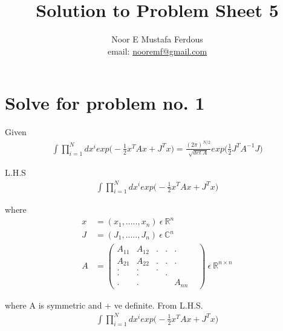 \documentclass[12pt, letterpaper]{article}
\title{Solution to Problem Sheet 5}
\author{Noor E Mustafa Ferdous\\ email: \href{mailto:nooremf@gmail.com}{nooremf@gmail.com} }
\date{}
\newcommand*{\1}{\hspace{1pt}}
\begin{document}
\maketitle

\section*{Solve for problem no. 1}

Given
\begin{align*}
    \int \prod ^{N} _{i=1} dx^{i} exp\bigg(-\frac{1}{2}x^{T}Ax + J^{T}x\bigg) = \frac{(2\pi)^{N/2}}{\sqrt{det \ A}}exp\bigg(\frac{1}{2}J^{T}A^{-1}J\bigg)
\end{align*}

L.H.S 
\begin{align*}
    \int \prod ^{N} _{i=1} dx^{i} exp\bigg(-\frac{1}{2}x^{T}Ax + J^{T}x\bigg)
\end{align*}

where
\begin{align*}
    x &= (x_{1}, .....  , x_{n}) \  \epsilon \ \mathbb{R} ^{n} \\
    J &= (J_{1}, .....  , J_{n}) \  \epsilon \ \mathbb{C} ^{n} \\
    A &= 
    \begin{pmatrix}
        A_{11} & A_{12} &. &. & .\\
        A_{21} & A_{22} & .& .& .\\
        .& .& .& & &\\
        .& .& & .& &\\
        .& .& & & A_{nn}
        \end{pmatrix}
         \ \epsilon  \ \mathbb{R}^{n \times n}
\end{align*}

where A is symmetric and + ve definite.
From L.H.S.
\begin{align*}
    \int \prod ^{N} _{i=1} dx^{i} exp\bigg(-\frac{1}{2}x^{T}Ax + J^{T}x\bigg)
\end{align*}
\end{document}
